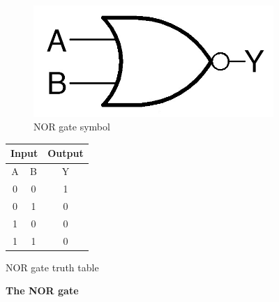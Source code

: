 \begin{figure}[ht]
	\begin{subfigure}[b]{.45\linewidth}
   		\centering
  		\includegraphics[scale = 1]{figs/nor}
   		\caption{NOR gate symbol}
   		\label{fig:norsym}
 	\end{subfigure}
 \quad
	 \begin{subtable}[b]{.45\linewidth}
   		\centering
   		\begin{tabular}{c c | c}
			\hline\hline
			\multicolumn{2}{c}{\bfseries Input} & \bfseries Output\\
			\hline
		 	A & B &  Y\\
			\hline
			0 & 0 & 1\\
			0 & 1 & 0\\
			1 & 0 & 0\\
			1 & 1 & 0\\
			\hline
		\end{tabular}
		\caption{NOR gate truth table}
		\label{table:nortruth}
	\end{subtable}
  	\caption{\bfseries The NOR gate}
	\label{fig:norgate}
 \end{figure}

